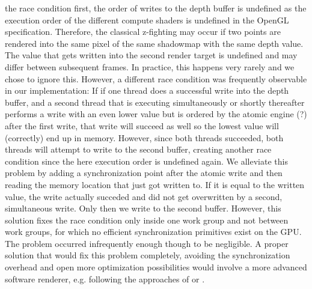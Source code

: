 \begin{outline}
\1 the race condition
    \2 first, the order of writes to the depth buffer is undefined as the execution order of the different compute shaders is undefined in the OpenGL specification. Therefore, the classical z-fighting may occur if two points are rendered into the same pixel of the same shadowmap with the same depth value. The value that gets written into the second render target is undefined and may differ between subsequent frames. In practice, this happens very rarely and we chose to ignore this.
    \2 However, a different race condition was frequently observable in our implementation:
    \2 If if one thread does a successful write into the depth buffer, and a second thread that is executing simultaneously or shortly thereafter performs a write with an even lower value but is ordered by the atomic engine (?) after the first write, that write will succeed as well so the lowest value will (correctly) end up in memory. However, since both threads succeeded, both threads will attempt to write to the second buffer, creating another race condition since the here execution order is undefined again. We alleviate this problem by adding a synchronization point after the atomic write and then reading the memory location that just got written to. If it is equal to the written value, the write actually succeded and did not get overwritten by a second, simultaneous write. Only then we write to the second buffer.
    \2 However, this solution fixes the race condition only inside one work group and not between work groups, for which no efficient synchronization primitives exist on the GPU. The problem occurred infrequently enough though to be negligible.
    \2 A proper solution that would fix this problem completely, avoiding the synchronization overhead and open more optimization possibilities would involve a more advanced software renderer, e.g. following the approaches of \cite{foo} or \cite{bar}.

\end{outline}


